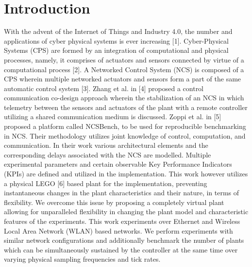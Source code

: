 \section{Introduction}\label{sec:intro}


With the advent of the Internet of Things and Industry 4.0, the number and applications of cyber physical systems is ever increasing [1].
Cyber-Physical Systems (CPS) are formed by an integration of computational and physical processes, namely, it comprises of actuators and sensors connected by virtue of a computational process [2]. A Networked Control System (NCS) is composed of a CPS wherein multiple networked actuators and sensors form a part of the same automatic control system [3].
Zhang et al. in [4] proposed a control communication co-design approach wherein the stabilization of an NCS in which telemetry between the sensors and actuators of the plant with a remote controller utilizing a shared communication medium is discussed.
Zoppi et al. in [5] proposed a platform called NCSBench, to be used for reproducible benchmarking in NCS.
Their methodology utilizes joint knowledge of control, computation, and communication.
In their work various architectural elements and the corresponding delays associated with the NCS are modelled.
Multiple experimental parameters and certain observable Key Performance Indicators (KPIs) are defined and utilized in the implementation.
This work however utilizes a physical LEGO [6] based plant for the implementation, preventing instantaneous changes in the plant characteristics and their nature, in terms of flexibility.
We overcome this issue by proposing a completely virtual plant allowing for unparalleled flexibility in changing the plant model and characteristic features of the experiments.
This work experiments over Ethernet and Wireless Local Area Network (WLAN) based networks.
We perform experiments with similar network configurations and additionally benchmark the number of plants which can be simultaneously sustained by the controller at the same time over varying physical sampling frequencies and tick rates.

